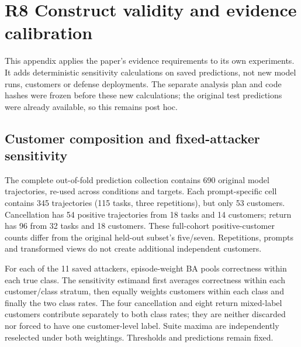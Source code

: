 \section{R8 Construct validity and evidence calibration}\label{sec:r8-empirical-audit}
This appendix applies the paper's evidence requirements to its own experiments. It adds deterministic sensitivity calculations on saved predictions, not new model runs, customers or defense deployments. The separate analysis plan and code hashes were frozen before these new calculations; the original test predictions were already available, so this remains post hoc.

\subsection{Customer composition and fixed-attacker sensitivity}
The complete out-of-fold prediction collection contains 690 original model trajectories, re-used across conditions and targets. Each prompt-specific cell contains 345 trajectories (115 tasks, three repetitions), but only 53 customers. Cancellation has 54 positive trajectories from 18 tasks and 14 customers; return has 96 from 32 tasks and 18 customers. These full-cohort positive-customer counts differ from the original held-out subset's five/seven. Repetitions, prompts and transformed views do not create additional independent customers.

For each of the 11 saved attackers, episode-weight BA pools correctness within each true class. The sensitivity estimand first averages correctness within each customer/class stratum, then equally weights customers within each class and finally the two class rates. The four cancellation and eight return mixed-label customers contribute separately to both class rates; they are neither discarded nor forced to have one customer-level label. Suite maxima are independently reselected under both weightings. Thresholds and predictions remain fixed.

